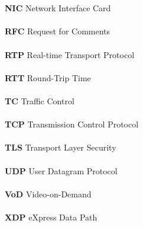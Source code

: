 \begin{tabbing}
    \\\\\textbf{NIC} \> Network Interface Card
    \\\\\textbf{RFC} \> Request for Comments
    \\\\\textbf{RTP} \> Real-time Transport Protocol
    \\\\\textbf{RTT} \> Round-Trip Time
    \\\\\textbf{TC} \> Traffic Control
    \\\\\textbf{TCP} \> Transmission Control Protocol
    \\\\\textbf{TLS} \> Transport Layer Security
    \\\\\textbf{UDP} \> User Datagram Protocol
    \\\\\textbf{VoD} \> Video-on-Demand
    \\\\\textbf{XDP} \> eXpress Data Path
\end{tabbing}


